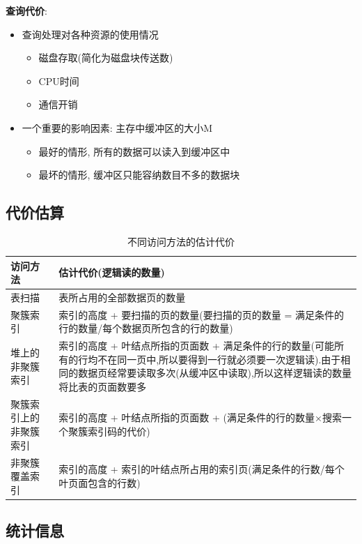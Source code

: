\textbf{查询代价}:
\begin{itemize}
    \item 查询处理对各种资源的使用情况
    \begin{itemize}
        \item 磁盘存取(简化为磁盘块传送数)
        \item CPU时间
        \item 通信开销
    \end{itemize}
    \item 一个重要的影响因素: 主存中缓冲区的大小M
    \begin{itemize}
        \item 最好的情形, 所有的数据可以读入到缓冲区中
        \item 最坏的情形, 缓冲区只能容纳数目不多的数据块
    \end{itemize}
\end{itemize}

\subsection{代价估算}

\begin{table}[H]
\centering
\begin{tabular}{|p{5cm}|p{10cm}|}
\hline
\textbf{访问方法} & \textbf{估计代价(逻辑读的数量)} \\ \hline
表扫描 & 表所占用的全部数据页的数量 \\ \hline
聚簇索引 & 索引的高度 + 要扫描的页的数量(要扫描的页的数量 = 满足条件的行的数量/每个数据页所包含的行的数量) \\ \hline
堆上的非聚簇索引 & 索引的高度 + 叶结点所指的页面数 + 满足条件的行的数量(可能所有的行均不在同一页中,所以要得到一行就必须要一次逻辑读).由于相同的数据页经常要读取多次(从缓冲区中读取),所以这样逻辑读的数量将比表的页面数要多 \\ \hline
聚簇索引上的非聚簇索引 & 索引的高度 + 叶结点所指的页面数 + (满足条件的行的数量×搜索一个聚簇索引码的代价) \\ \hline
非聚簇覆盖索引 & 索引的高度 + 索引的叶结点所占用的索引页(满足条件的行数/每个叶页面包含的行数) \\ \hline
\end{tabular}
\caption{不同访问方法的估计代价}
\label{tab:access_methods_cost_simple}
\end{table}

\subsection{统计信息}


